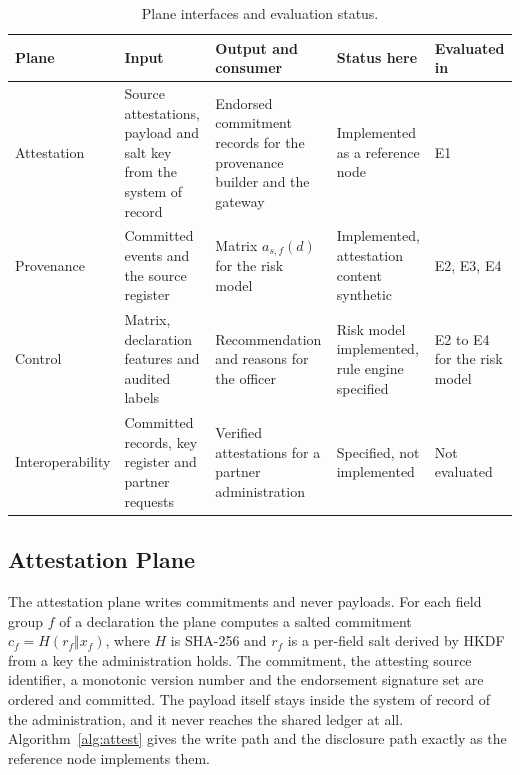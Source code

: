 \documentclass[information,article,submit,moreauthors]{Definitions/mdpi}
\begin{document}
\begin{table}[H]
\caption{Plane interfaces and evaluation status.\label{tab:planes}}
\small
\begin{tabularx}{\textwidth}{>{\raggedright\arraybackslash}p{1.9cm}>{\raggedright\arraybackslash}X>{\raggedright\arraybackslash}X>{\raggedright\arraybackslash}p{2.9cm}>{\raggedright\arraybackslash}p{1.5cm}}
\toprule
\textbf{Plane} & \textbf{Input} & \textbf{Output and consumer} & \textbf{Status here} & \textbf{Evaluated in}\\
\midrule
Attestation & Source attestations, payload and salt key from the system of record & Endorsed commitment records for the provenance builder and the gateway & Implemented as a reference node & E1\\
Provenance & Committed events and the source register & Matrix $a_{s,f}(d)$ for the risk model & Implemented, attestation content synthetic & E2, E3, E4\\
Control & Matrix, declaration features and audited labels & Recommendation and reasons for the officer & Risk model implemented, rule engine specified & E2 to E4 for the risk model\\
Interoperability & Committed records, key register and partner requests & Verified attestations for a partner administration & Specified, not implemented & Not evaluated\\
\bottomrule
\end{tabularx}
\end{table}

\subsection{Attestation Plane}

The attestation plane writes commitments and never payloads. For each field group $f$ of a declaration the plane computes a salted commitment $c_f = H(r_f \Vert x_f)$, where $H$ is SHA-256 and $r_f$ is a per-field salt derived by HKDF from a key the administration holds. The commitment, the attesting source identifier, a monotonic version number and the endorsement signature set are ordered and committed. The payload itself stays inside the system of record of the administration, and it never reaches the shared ledger at all. Algorithm~\ref{alg:attest} gives the write path and the disclosure path exactly as the reference node implements them.
\end{document}
